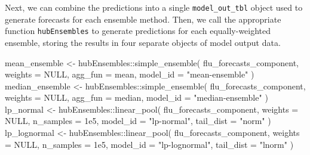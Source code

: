 \documentclass[
  letterpaper,
  DIV=11,
  numbers=noendperiod]{scrartcl}
\newenvironment{Shaded}{\begin{snugshade}}{\end{snugshade}}
\newcommand{\AttributeTok}[1]{\textcolor[rgb]{0.40,0.45,0.13}{#1}}
\newcommand{\ConstantTok}[1]{\textcolor[rgb]{0.56,0.35,0.01}{#1}}
\newcommand{\FloatTok}[1]{\textcolor[rgb]{0.68,0.00,0.00}{#1}}
\newcommand{\FunctionTok}[1]{\textcolor[rgb]{0.28,0.35,0.67}{#1}}
\newcommand{\NormalTok}[1]{\textcolor[rgb]{0.00,0.23,0.31}{#1}}
\newcommand{\OtherTok}[1]{\textcolor[rgb]{0.00,0.23,0.31}{#1}}
\newcommand{\SpecialCharTok}[1]{\textcolor[rgb]{0.37,0.37,0.37}{#1}}
\newcommand{\StringTok}[1]{\textcolor[rgb]{0.13,0.47,0.30}{#1}}
\begin{document}
Next, we can combine the predictions into a single
\texttt{model\_out\_tbl} object used to generate forecasts for each
ensemble method. Then, we call the appropriate function
\texttt{hubEnsembles} to generate predictions for each equally-weighted
ensemble, storing the results in four separate objects of model output
data.

\begin{Shaded}
\begin{Highlighting}[]
\NormalTok{mean\_ensemble }\OtherTok{\textless{}{-}}\NormalTok{ hubEnsembles}\SpecialCharTok{::}\FunctionTok{simple\_ensemble}\NormalTok{(}
\NormalTok{  flu\_forecasts\_component,}
  \AttributeTok{weights =} \ConstantTok{NULL}\NormalTok{,}
  \AttributeTok{agg\_fun =}\NormalTok{ mean,}
  \AttributeTok{model\_id =} \StringTok{"mean{-}ensemble"}
\NormalTok{)}
\NormalTok{median\_ensemble }\OtherTok{\textless{}{-}}\NormalTok{ hubEnsembles}\SpecialCharTok{::}\FunctionTok{simple\_ensemble}\NormalTok{(}
\NormalTok{  flu\_forecasts\_component,}
    \AttributeTok{weights =} \ConstantTok{NULL}\NormalTok{,}
    \AttributeTok{agg\_fun =}\NormalTok{ median,}
    \AttributeTok{model\_id =} \StringTok{"median{-}ensemble"}
\NormalTok{  )}
\NormalTok{lp\_normal }\OtherTok{\textless{}{-}}\NormalTok{ hubEnsembles}\SpecialCharTok{::}\FunctionTok{linear\_pool}\NormalTok{(}
\NormalTok{  flu\_forecasts\_component,}
  \AttributeTok{weights =} \ConstantTok{NULL}\NormalTok{,}
  \AttributeTok{n\_samples =} \FloatTok{1e5}\NormalTok{,}
  \AttributeTok{model\_id =} \StringTok{"lp{-}normal"}\NormalTok{,}
  \AttributeTok{tail\_dist =} \StringTok{"norm"}
\NormalTok{)}
\NormalTok{lp\_lognormal }\OtherTok{\textless{}{-}}\NormalTok{ hubEnsembles}\SpecialCharTok{::}\FunctionTok{linear\_pool}\NormalTok{(}
\NormalTok{  flu\_forecasts\_component,}
  \AttributeTok{weights =} \ConstantTok{NULL}\NormalTok{,}
  \AttributeTok{n\_samples =} \FloatTok{1e5}\NormalTok{,}
  \AttributeTok{model\_id =} \StringTok{"lp{-}lognormal"}\NormalTok{,}
  \AttributeTok{tail\_dist =} \StringTok{"lnorm"}
\NormalTok{) }
\end{Highlighting}
\end{Shaded}
\end{document}
